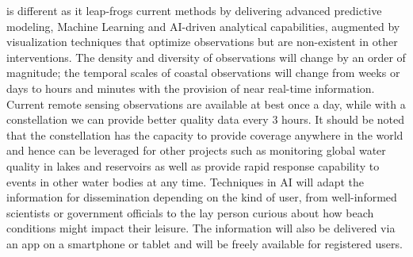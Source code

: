\pro is different as it leap-frogs current methods by delivering
advanced predictive modeling, Machine Learning and AI-driven
analytical capabilities, augmented by visualization techniques that
optimize observations but are non-existent in other interventions. The
density and diversity of observations will change by an order of
magnitude; the temporal scales of coastal observations will change
from weeks or days to hours and minutes with the provision of near
real-time information. Current remote sensing observations are
available at best once a day, while with a \sml constellation we can
provide better quality data every 3 hours.  It should be noted that
the \sml constellation has the capacity to provide coverage anywhere
in the world and hence can be leveraged for other projects such as
monitoring global water quality in lakes and reservoirs as well as
provide rapid response capability to events in other water bodies at
any time. Techniques in AI will adapt the information for
dissemination depending on the kind of user, from well-informed
scientists or government officials to the lay person curious about how
beach conditions might impact their leisure. The information will also
be delivered via an app on a smartphone or tablet and will be freely
available for registered users. %




